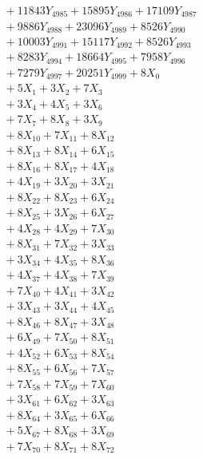\documentclass[a4paper,10pt]{article}
\begin{document}
{\begin{align}
&\;  + 11843 Y_{4985} + 15895 Y_{4986} + 17109 Y_{4987} \\[0.3ex]
&\;  + 9886 Y_{4988} + 23096 Y_{4989} + 8526 Y_{4990} \\[0.3ex]
&\;  + 10003 Y_{4991} + 15117 Y_{4992} + 8526 Y_{4993} \\[0.3ex]
&\;  + 8283 Y_{4994} + 18664 Y_{4995} + 7958 Y_{4996} \\[0.3ex]
&\;  + 7279 Y_{4997} + 20251 Y_{4999} + 8 X_{0} \\[0.3ex]
&\;  + 5 X_{1} + 3 X_{2} + 7 X_{3} \\[0.3ex]
&\;  + 3 X_{4} + 4 X_{5} + 3 X_{6} \\[0.3ex]
&\;  + 7 X_{7} + 8 X_{8} + 3 X_{9} \\[0.5ex]\allowbreak
&\;  + 8 X_{10} + 7 X_{11} + 8 X_{12} \\[0.3ex]
&\;  + 8 X_{13} + 8 X_{14} + 6 X_{15} \\[0.3ex]
&\;  + 8 X_{16} + 8 X_{17} + 4 X_{18} \\[0.3ex]
&\;  + 4 X_{19} + 3 X_{20} + 3 X_{21} \\[0.3ex]
&\;  + 8 X_{22} + 8 X_{23} + 6 X_{24} \\[0.3ex]
&\;  + 8 X_{25} + 3 X_{26} + 6 X_{27} \\[0.3ex]
&\;  + 4 X_{28} + 4 X_{29} + 7 X_{30} \\[0.3ex]
&\;  + 8 X_{31} + 7 X_{32} + 3 X_{33} \\[0.3ex]
&\;  + 3 X_{34} + 4 X_{35} + 8 X_{36} \\[0.3ex]
&\;  + 4 X_{37} + 4 X_{38} + 7 X_{39} \\[0.5ex]\allowbreak
&\;  + 7 X_{40} + 4 X_{41} + 3 X_{42} \\[0.3ex]
&\;  + 3 X_{43} + 3 X_{44} + 4 X_{45} \\[0.3ex]
&\;  + 8 X_{46} + 8 X_{47} + 3 X_{48} \\[0.3ex]
&\;  + 6 X_{49} + 7 X_{50} + 8 X_{51} \\[0.3ex]
&\;  + 4 X_{52} + 6 X_{53} + 8 X_{54} \\[0.3ex]
&\;  + 8 X_{55} + 6 X_{56} + 7 X_{57} \\[0.3ex]
&\;  + 7 X_{58} + 7 X_{59} + 7 X_{60} \\[0.3ex]
&\;  + 3 X_{61} + 6 X_{62} + 3 X_{63} \\[0.3ex]
&\;  + 8 X_{64} + 3 X_{65} + 6 X_{66} \\[0.3ex]
&\;  + 5 X_{67} + 8 X_{68} + 3 X_{69} \\[0.5ex]\allowbreak
&\;  + 7 X_{70} + 8 X_{71} + 8 X_{72} \\[0.3ex]

\end{align}}
\end{document}
